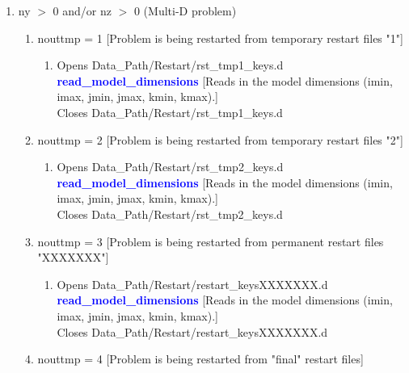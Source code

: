 \documentclass[11pt,doublespace]{article}
\begin{document}
\begin{itemize}
\begin{enumerate}
{\begin{enumerate}
  \item ny $>$ 0 and/or nz $>$ 0 (Multi-D problem)
  
\begin{enumerate}

  \item nouttmp = 1
  [Problem is being restarted from temporary restart files "1"]
  
\begin{enumerate}
  
  \item Opens Data\_Path/Restart/rst\_tmp1\_keys.d \\
  \textcolor{blue}{ {\bf read\_model\_dimensions} }
  [Reads in the model dimensions (imin, imax, jmin, jmax, kmin, kmax).] \\
  Closes Data\_Path/Restart/rst\_tmp1\_keys.d

\end{enumerate}

  \item nouttmp = 2
  [Problem is being restarted from temporary restart files "2"]
  
\begin{enumerate}
  
  \item Opens Data\_Path/Restart/rst\_tmp2\_keys.d \\
  \textcolor{blue}{ {\bf read\_model\_dimensions} }
  [Reads in the model dimensions (imin, imax, jmin, jmax, kmin, kmax).] \\
  Closes Data\_Path/Restart/rst\_tmp2\_keys.d

\end{enumerate}

  \item nouttmp = 3
  [Problem is being restarted from permanent restart files "XXXXXXX"]
  
\begin{enumerate}
  
  \item Opens Data\_Path/Restart/restart\_keysXXXXXXX.d \\
  \textcolor{blue}{ {\bf read\_model\_dimensions} }
  [Reads in the model dimensions (imin, imax, jmin, jmax, kmin, kmax).] \\
  Closes Data\_Path/Restart/restart\_keysXXXXXXX.d

\end{enumerate}

  \item nouttmp = 4
  [Problem is being restarted from "final" restart files]
  

\end{enumerate}
\end{enumerate}}
\end{enumerate}
\end{itemize}
\end{document}
